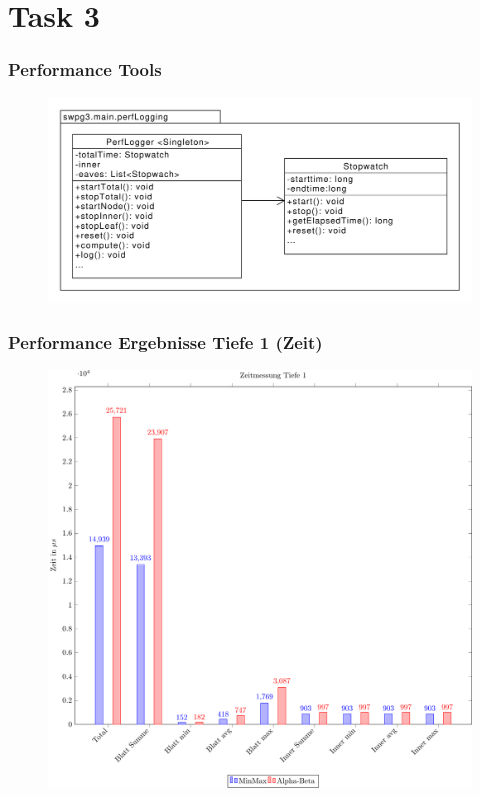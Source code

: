 \documentclass{beamer}
\begin{document}
\section{Task 3}

\begin{frame}
\frametitle{Performance Tools}

  \begin{figure}
    \centering
    \includegraphics[width=\textwidth]{figures/ClassDiagrammPerfLogging.pdf}
  \end{figure}

\end{frame}


\begin{frame}
\frametitle{Performance Ergebnisse Tiefe 1 (Zeit)}
  \begin{figure}
    \centering
    \includegraphics[scale=0.4]{figures/time-1.pdf}
  \end{figure}

\end{frame}
\end{document}
